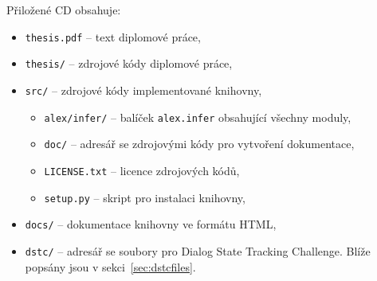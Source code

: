 \documentclass[12pt,a4paper]{report}
\let\openright=\clearpage
\begin{document}
Přiložené CD obsahuje:

\newcommand{\priloha}[2]{\item \texttt{#1} -- #2}
\begin{itemize}
\priloha{thesis.pdf}{text diplomové práce,}
\priloha{thesis/}{zdrojové kódy diplomové práce,}
\priloha{src/}{zdrojové kódy implementované knihovny,
	\begin{itemize}
	\priloha{alex/infer/}{balíček \texttt{alex.infer} obsahující všechny moduly,}
	\priloha{doc/}{adresář se zdrojovými kódy pro vytvoření dokumentace,}
	\priloha{LICENSE.txt}{licence zdrojových kódů,}
	\priloha{setup.py}{skript pro instalaci knihovny,}
	\end{itemize}
}
\priloha{docs/}{dokumentace knihovny ve formátu HTML,}
\priloha{dstc/}{adresář se soubory pro Dialog State Tracking Challenge. Blíže popsány jsou v sekci~\ref{sec:dstcfiles}.
}
\end{itemize}

\openright
\end{document}
